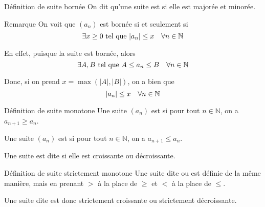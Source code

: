 \documentclass[a4paper]{article}
\begin{document}
\begin{parag}{Définition de suite bornée}
    On dit qu'une suite est  si elle est majorée et minorée.

    \begin{subparag}{Remarque}
        On voit que $\left(a_n\right)$ est bornée si et seulement si 
        \[\exists x \geq 0 \telque \left|a_n\right| \leq x \mathspace \forall n \in \mathbb{N}\]

        En effet, puisque la suite est bornée, alors
        \[\exists A, B \text{ tel que } A \leq a_n \leq B \quad \forall n \in \mathbb{N}\]

        Donc, si on prend $x = \max\left(\left|A\right|, \left|B\right|\right)$, on a bien que 
        \[\left|a_n\right| \leq x \mathspace \forall n \in \mathbb{N}\]
    \end{subparag}
\end{parag}

\begin{parag}{Définition de suite monotone}
    Une suite $\left(a_n\right)$ est  si pour tout $n \in \mathbb{N}$, on a $a_{n + 1} \geq a_n$.

    Une suite $\left(a_n\right)$ est  si pour tout $n \in \mathbb{N}$, on a $a_{n + 1} \leq a_n$.

    Une suite est dite  si elle est croissante ou décroissante.
\end{parag}

\begin{parag}{Définition de suite strictement monotone}
    Une suite dite  ou  est définie de la même manière, mais en prenant $>$ à la place de $\geq$ et $<$ à la place de $\leq$.

    Une suite dite  est donc strictement croissante ou strictement décroissante. 
\end{parag}
\end{document}
